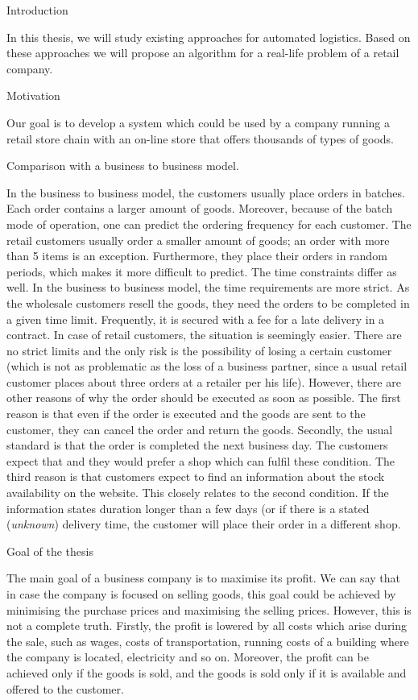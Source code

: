 \newpage
\chap Introduction

In this thesis, we will study existing approaches for automated logistics. Based on these approaches we will propose an algorithm for a real-life problem of a retail company.

\sec Motivation

Our goal is to develop a system which could be used by a company running a retail store chain with an on-line store that offers thousands of types of goods.

\secc Comparison with a business to business model.

In the business to business model, the customers usually place orders in batches. Each order contains a larger amount of goods. Moreover, because of the batch mode of operation,
one can predict the ordering frequency for each customer. The retail customers usually order a smaller amount of goods; an order with more than 5 items is an exception. 
Furthermore, they place their orders in random periods, which makes it more difficult to predict. The time constraints differ as well. In the business to business model, the time requirements are more strict. As the wholesale customers resell the goods, they need the orders to be completed in a given time limit. Frequently, it is secured with a fee for a late delivery in a contract. In case of retail customers, the situation is seemingly easier. There are no strict limits and the only risk is the possibility of losing
a certain customer (which is not as problematic as the loss of a business partner, since a usual retail customer places about three orders at a retailer
per his life). However, there are other reasons of why the order should be executed as soon as possible. The first reason is that even if the order is executed and the goods
are sent to the customer, they can cancel the order and return the goods. Secondly, the usual standard is that the order is completed the next business day.
The customers expect that and they would prefer a shop which can fulfil these condition. The third reason is that customers expect to find an information about the
stock availability on the website. This closely relates to the second condition. If the information states duration longer than a few days (or if there is a stated ({\em unknown}) delivery time, the customer will place their order in a different shop.

\secc Goal of the thesis

The main goal of a business company is to maximise its profit. We can say that in case the company is focused on selling goods, this goal could be achieved by minimising the purchase prices and maximising the selling prices. However, this is not a complete truth. Firstly, the profit is lowered by all costs which arise during the sale, such as
wages, costs of transportation, running costs of a building where the company is located, electricity and so on. Moreover, the profit can be achieved only if the goods
is sold, and the goods is sold only if it is available and offered to the customer.


